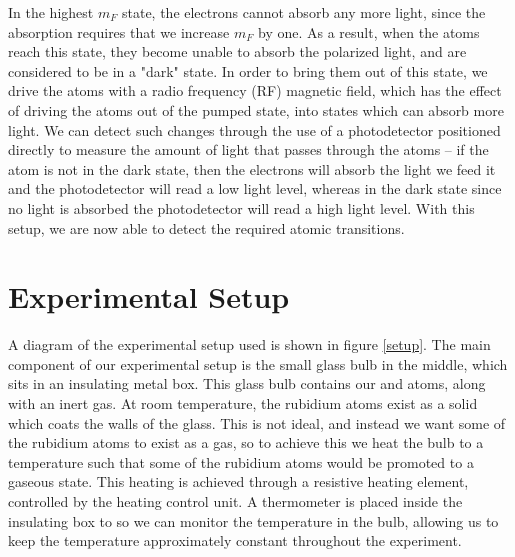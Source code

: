 \documentclass[10pt]{article}
\begin{document}
	In the highest \( m_F \) state, the electrons cannot absorb any more light, since
	the absorption requires that we increase \( m_F \) by one. As a result, when the
	atoms reach this state, they become unable to absorb the polarized light, and are
	considered to be in a "dark" state. In order to bring them out of this state, we
	drive the atoms with a radio frequency (RF) magnetic field, which has the effect
	of driving the atoms out of the pumped state, into states which can absorb more
	light. We can detect such changes through the use of a photodetector positioned
	directly to measure the amount of light that passes through the atoms -- if the
	atom is not in the dark state, then the electrons will absorb the light we feed
	it and the photodetector will read a low light level, whereas in the dark state
	since no light is absorbed the photodetector will read a high light level. With
	this setup, we are now able to detect the required atomic transitions.

	\section{Experimental Setup}
	A diagram of the experimental setup used is shown in figure \ref{setup}.
	The main component of our experimental setup is the small glass bulb in the
	middle, which sits in an insulating metal box. This glass bulb contains our
	 and  atoms, along with an
	inert gas. At room temperature, the rubidium atoms exist as a solid which coats 
	the walls of the glass. This is not ideal, and instead we want some of the 
	rubidium atoms to exist as a gas, so to achieve this we heat the bulb to a
	temperature such that some of the rubidium atoms would be promoted to a gaseous
	state. This heating is achieved through a resistive heating element, controlled
	by the heating control unit. A thermometer is placed inside the insulating box to
	so we can monitor the temperature in the bulb, allowing us to keep the
	temperature approximately constant throughout the experiment.   
\end{document}
